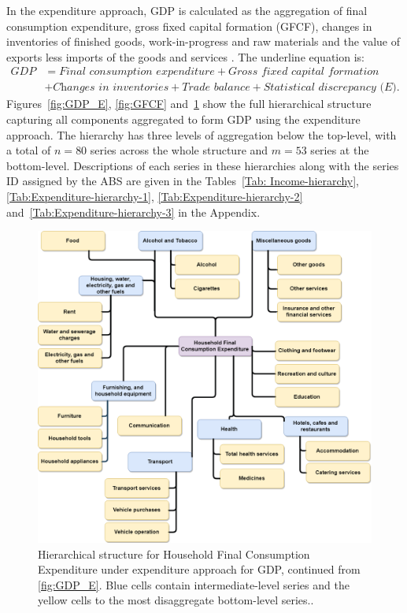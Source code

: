 \documentclass[graybox]{svmult}
\begin{document}
In the expenditure approach, GDP is calculated as the aggregation of final consumption expenditure, gross fixed capital formation (GFCF), changes in inventories of finished goods, work-in-progress and raw materials and the value of exports less imports of the goods and services \citep{ABS2015}. The underline equation is:
\begin{align*}
	\textit{GDP}
	 & = \textit{Final consumption expenditure} + \textit{Gross fixed capital formation}                  \\
	 & + \textit{Changes in inventories} + \textit{Trade balance} + \textit{Statistical discrepancy (E)}.
\end{align*}
Figures~\ref{fig:GDP_E}, \ref{fig:GFCF} and~\ref{fig:HFCE} show the full hierarchical structure capturing all components aggregated to form GDP using the expenditure approach. The hierarchy has three levels of aggregation below the top-level, with a total of $n=80$ series across the whole structure and $m=53$ series at the bottom-level. Descriptions of each series in these hierarchies along with the series ID assigned by the ABS are given in the Tables~\ref{Tab: Income-hierarchy}, \ref{Tab:Expenditure-hierarchy-1}, \ref{Tab:Expenditure-hierarchy-2} and~\ref{Tab:Expenditure-hierarchy-3} in the Appendix.

\begin{figure}[!t]
	\centering
	\includegraphics[width=.9\textwidth]{Figs/HFCE.png}
	\caption{Hierarchical structure for Household Final Consumption Expenditure under expenditure approach for GDP, continued from \autoref{fig:GDP_E}. Blue cells contain intermediate-level series and the yellow cells to the most disaggregate bottom-level series..}\label{fig:HFCE}
\end{figure}
\end{document}
